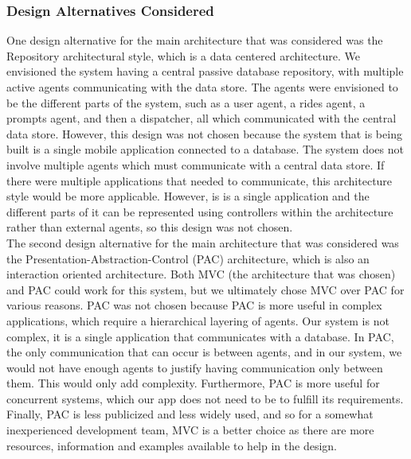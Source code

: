 \documentclass[]{article}
\begin{document}
\subsubsection{Design Alternatives Considered}
One design alternative for the main architecture that was considered was the Repository architectural style, which is a data centered architecture. We envisioned the system having a 
central passive database repository, with multiple active agents communicating with the data store. The agents were envisioned to be the different parts of 
the system, such as a user agent, a rides agent, a prompts agent, and then a dispatcher, all which communicated with the central data store. However, this design 
was not chosen because the system that is being built is a single mobile application connected to a database. The system does not involve multiple agents which 
must communicate with a central data store. If there were multiple applications that needed to communicate, this architecture style would be more applicable. However, 
is is a single application and the different parts of it can be represented using controllers within the architecture rather than external agents, so this design 
was not chosen. \\

\noindent The second design alternative for the main architecture that was considered was the Presentation-Abstraction-Control (PAC) architecture, which is also 
an interaction oriented architecture. Both MVC (the architecture that was chosen) and PAC could work for this system, but we ultimately chose MVC over PAC for 
various reasons. PAC was not chosen because PAC is more useful in complex applications, which require a hierarchical layering of agents. Our system is not complex, 
it is a single application that communicates with a database. In PAC, the only communication that can occur is between agents, and in our system, we would not 
have enough agents to justify having communication only between them. This would only add complexity. Furthermore, PAC is more useful for concurrent systems, which 
our app does not need to be to fulfill its requirements. Finally, PAC is less publicized and less widely used, and so for a somewhat inexperienced development team, MVC 
is a better choice as there are more resources, information and examples available to help in the design.
\end{document}
